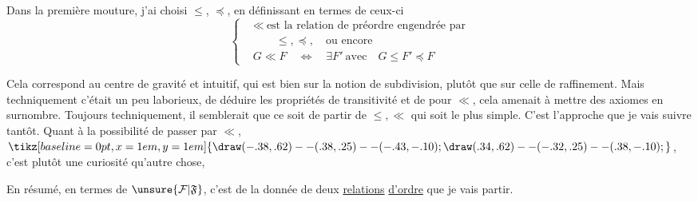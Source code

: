 Dans la première mouture, j'ai choisi $\leq$, $\preccurlyeq$, en définissant en termes de ceux-ci
\[
\left\{\begin{aligned}
 &\ll\ \text{est la relation de préordre engendrée par}\\
 &\qquad\leq,\preccurlyeq,\quad \text{ou encore}\\
 &G\ll F\quad\Longleftrightarrow\quad\exists F'\ \text{avec}\quad G\leq F'\preccurlyeq F
\end{aligned}\right.
\tag*{(1.29)}
\]

Cela correspond au centre de gravité   et intuitif, qui est bien sur la notion de subdivision, plutôt que sur celle de raffinement. Mais techniquement c'était un peu laborieux, de déduire les propriétés de transitivité et  de  pour $\ll$, cela amenait à mettre des axiomes en surnombre. Toujours techniquement, il semblerait que ce soit de partir de $\leq,\ll$ qui soit le plus simple. C'est l'approche que je vais suivre tantôt. Quant à la possibilité de passer par $\ll$, $\mathrel{\tikz[baseline=0pt,x=1em,y=1em]{\draw (-.38,.62)--(.38,.25)--(-.43,-.10); \draw (.34,.62)--(-.32,.25)--(.38,-.10);}}$, c'est plutôt une curiosité qu'autre chose,

En résumé, en termes de $\unsure{\mathcal{F}|\mathfrak{F}}$, c'est de la donnée de deux \uline{relations} \uline{d'ordre}
que je vais partir.

